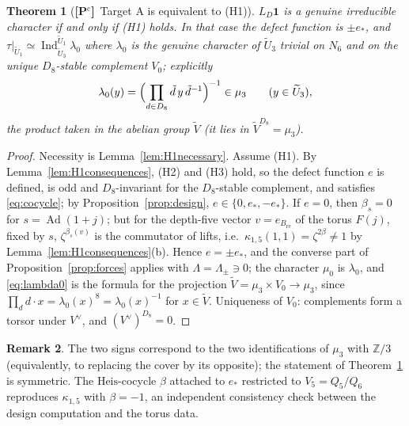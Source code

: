 \documentclass[11pt]{article}
\newcommand{\Z}{\mathbb Z}
\newcommand{\Ind}{\operatorname{Ind}}
\newcommand{\Ad}{\operatorname{Ad}}
\newcommand{\tU}{\widetilde U}
\newcommand{\tV}{\widetilde V}
\newcommand{\Heis}{\mathrm{Heis}}
\newcommand{\Pctag}{\textnormal{\textbf{[P$^{\mathrm c}$]}}}
\theoremstyle{plain}
\newtheorem{theorem}{Theorem}[section]
\theoremstyle{definition}
\newtheorem{remark}[theorem]{Remark}
\begin{document}
\begin{theorem}[\Pctag\ Target A is equivalent to (H1)]\label{thm:H1equiv}
$L_D\mathbf1$ is a genuine irreducible character if and only if (H1)
holds.  In that case the defect function is $\pm e_*$, and
$\tau|_{\tU_1}\simeq\Ind_{\tU_3}^{\tU_1}\lambda_0$ where $\lambda_0$ is the
genuine character of $\tU_3$ trivial on $N_6$ and on the unique
$D_8$-stable complement $V_0$; explicitly
\begin{equation}\label{eq:lambda0}
 \lambda_0(y)=\Bigl(\prod_{d\in D_8}\tilde d\,y\,\tilde d^{-1}\Bigr)^{-1}
 \in\mu_3\qquad(y\in\tU_3),
\end{equation}
the product taken in the abelian group $\tV$ (it lies in $\tV^{D_8}=\mu_3$).
\end{theorem}
\begin{proof}
Necessity is Lemma~\ref{lem:H1necessary}.  Assume (H1).  By
Lemma~\ref{lem:H1consequences}, (H2) and (H3) hold, so the defect
function $e$ is defined, is odd and $D_8$-invariant for the
$D_8$-stable complement, and satisfies \eqref{eq:cocycle}; by
Proposition~\ref{prop:design}, $e\in\{0,e_*,-e_*\}$.  If $e=0$, then
$\beta_s=0$ for $s=\Ad(1+j)$; but for the depth-five vector
$v=e_{B_{\mathrm{re}}}$ of the torus $F(j)$, fixed by $s$,
$\zeta^{\beta_s(v)}$ is the commutator of lifts, i.e.\
$\kappa_{1,5}(1,1)=\zeta^{2\beta}\ne1$ by Lemma~\ref{lem:H1consequences}(b).
Hence $e=\pm e_*$, and the converse part of Proposition~\ref{prop:forces}
applies with $\Lambda=\Lambda_\pm\ni0$; the character $\mu_0$ is
$\lambda_0$, and \eqref{eq:lambda0} is the formula for the projection
$\tV=\mu_3\times V_0\to\mu_3$, since $\prod_{d}d\cdot x=\lambda_0(x)^8=\lambda_0(x)^{-1}$
for $x\in\tV$.  Uniqueness of $V_0$: complements form a torsor under
$V^\vee$, and $(V^\vee)^{D_8}=0$.
\end{proof}

\begin{remark}
The two signs correspond to the two identifications of $\mu_3$ with
$\Z/3$ (equivalently, to replacing the cover by its opposite); the
statement of Theorem~\ref{thm:H1equiv} is symmetric.  The
$\Heis$-cocycle $\beta$ attached to $e_*$ restricted to
$V_5=Q_5/Q_6$ reproduces $\kappa_{1,5}$ with $\beta=-1$, an independent
consistency check between the design computation and the torus data.
\end{remark}
\end{document}
